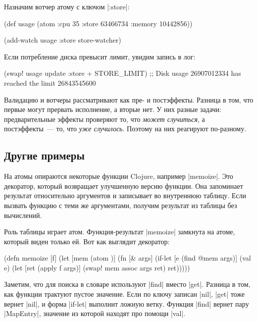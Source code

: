 Назначим вотчер атому с ключом \spverb|:store|:

\begin{english}
  \begin{clojure}
(def usage
  (atom {:cpu 35
         :store 63466734
         :memory 10442856}))

(add-watch usage :store store-watcher)
  \end{clojure}
\end{english}

\noindent
Если потребление диска превысит лимит, увидим запись в лог:

\begin{english}
  \begin{clojure}
(swap! usage update :store + STORE_LIMIT)
;; Disk usage 26907012334 has reached the limit 26843545600
  \end{clojure}
\end{english}

Валидацию и вотчеры рассматривают как пре- и постэффекты. Разница в том, что
первые могут прервать исполнение, а вторые нет. У них разные задачи:
предварительные эффекты проверяют то, что \emph{может случиться}, а
постэффекты~--- то, что \emph{уже случилось}. Поэтому на них реагируют
по-разному.

\subsection{Другие примеры}

На атомы опираются некоторые функции Clojure, например \spverb|memoize|. Это
декоратор, который возвращает улучшенную версию функции. Она запоминает
результат относительно аргументов и записывает во внутреннюю таблицу. Если
вызвать функцию с теми же аргументами, получим результат из таблицы без
вычислений.

Роль таблицы играет атом. Функция-результат \spverb|memoize| замкнута на атоме,
который виден только ей. Вот как выглядит декоратор:

\begin{english}
  \begin{clojure}
(defn memoize [f]
  (let [mem (atom {})]
    (fn [& args]
      (if-let [e (find @mem args)]
        (val e)
        (let [ret (apply f args)]
          (swap! mem assoc args ret)
          ret)))))
  \end{clojure}
\end{english}

Заметим, что для поиска в словаре используют \spverb|find| вместо
\spverb|get|. Разница в том, как функции трактуют пустое значение. Если по ключу
записан \spverb|nil|, \spverb|get| тоже вернет \spverb|nil|, и форма
\spverb|if-let| выполнит ложную ветку. Функция \spverb|find| вернет пару
\spverb|MapEntry|, значение из которой находят про помощи \spverb|val|.

